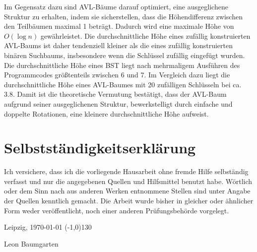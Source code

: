 \documentclass[12pt]{article}
\begin{document}
		Im Gegensatz dazu sind AVL-Bäume darauf optimiert, eine ausgeglichene Struktur zu erhalten, indem sie sicherstellen, dass die Höhendifferenz zwischen den Teilbäumen maximal 1 beträgt. Dadurch wird eine maximale Höhe von \(O(\log n)\) gewährleistet. Die durchschnittliche Höhe eines zufällig konstruierten AVL-Baums ist daher tendenziell kleiner als die eines zufällig konstruierten binären Suchbaums, insbesondere wenn die Schlüssel zufällig eingefügt wurden. \newline
		Die durchschnittliche Höhe eines BST liegt nach mehrmaligem Ausführen des Programmcodes größtenteils zwischen 6 und 7. Im Vergleich dazu liegt die durchschnittliche Höhe eines AVL-Baumes mit 20 zufälligen Schlüsseln bei ca. 3.8. Damit ist die theoretische Vermutung bestätigt, dass der AVL-Baum aufgrund seiner ausgeglichenen Struktur, bewerkstelligt durch einfache und doppelte Rotationen, eine kleinere durchschnittliche Höhe aufweist. \cite{binaryTreeD}
		\newpage
		
		\section{Selbstständigkeitserklärung}
		Ich versichere, dass ich die vorliegende Hausarbeit ohne
		fremde Hilfe selbständig verfasst und nur die angegebenen Quellen und Hilfsmittel
		benutzt habe. Wörtlich oder dem Sinn nach aus anderen Werken entnommene Stellen
		sind unter Angabe der Quellen kenntlich gemacht. Die Arbeit wurde bisher in gleicher
		oder ähnlicher Form weder veröffentlicht, noch einer anderen Prüfungsbehörde
		vorgelegt. 
		\vspace{16cm}
		
		Leipzig, \today \hspace{6cm} \line(-1,0){130}
		\begin{center}
			\hspace{36mm} {\footnotesize Leon Baumgarten}
		\end{center}
		
\end{document}

